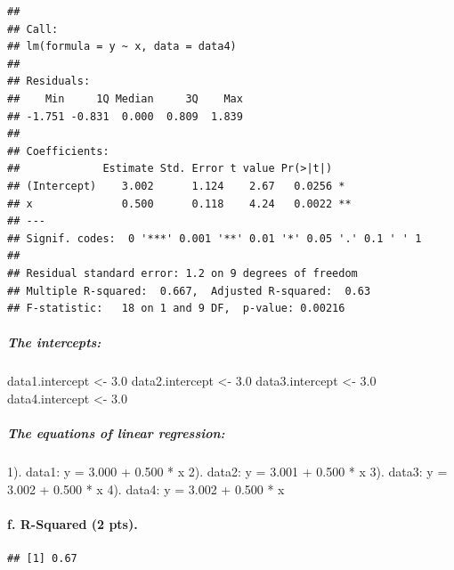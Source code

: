 \documentclass[]{article}
\newenvironment{Shaded}{\begin{snugshade}}{\end{snugshade}}
\newcommand{\KeywordTok}[1]{\textcolor[rgb]{0.13,0.29,0.53}{\textbf{#1}}}
\newcommand{\FloatTok}[1]{\textcolor[rgb]{0.00,0.00,0.81}{#1}}
\newcommand{\StringTok}[1]{\textcolor[rgb]{0.31,0.60,0.02}{#1}}
\newcommand{\OperatorTok}[1]{\textcolor[rgb]{0.81,0.36,0.00}{\textbf{#1}}}
\newcommand{\NormalTok}[1]{#1}
\let\oldparagraph\paragraph
\renewcommand{\paragraph}[1]{\oldparagraph{#1}\mbox{}}
\let\oldsubparagraph\subparagraph
\renewcommand{\subparagraph}[1]{\oldsubparagraph{#1}\mbox{}}
\begin{document}
\begin{verbatim}
## 
## Call:
## lm(formula = y ~ x, data = data4)
## 
## Residuals:
##    Min     1Q Median     3Q    Max 
## -1.751 -0.831  0.000  0.809  1.839 
## 
## Coefficients:
##             Estimate Std. Error t value Pr(>|t|)   
## (Intercept)    3.002      1.124    2.67   0.0256 * 
## x              0.500      0.118    4.24   0.0022 **
## ---
## Signif. codes:  0 '***' 0.001 '**' 0.01 '*' 0.05 '.' 0.1 ' ' 1
## 
## Residual standard error: 1.2 on 9 degrees of freedom
## Multiple R-squared:  0.667,  Adjusted R-squared:  0.63 
## F-statistic:   18 on 1 and 9 DF,  p-value: 0.00216
\end{verbatim}

\subparagraph{The intercepts:}\label{the-intercepts}

\begin{Shaded}
\begin{Highlighting}[]
\NormalTok{data1.intercept <-}\StringTok{ }\FloatTok{3.0}
\NormalTok{data2.intercept <-}\StringTok{ }\FloatTok{3.0}
\NormalTok{data3.intercept <-}\StringTok{ }\FloatTok{3.0}
\NormalTok{data4.intercept <-}\StringTok{ }\FloatTok{3.0}
\end{Highlighting}
\end{Shaded}

\subparagraph{The equations of linear
regression:}\label{the-equations-of-linear-regression}

1). data1: y = 3.000 + 0.500 * x 2). data2: y = 3.001 + 0.500 * x 3).
data3: y = 3.002 + 0.500 * x 4). data4: y = 3.002 + 0.500 * x

\paragraph{f. R-Squared (2 pts).}\label{f.-r-squared-2-pts.}

\begin{Shaded}
\end{Shaded}

\begin{verbatim}
## [1] 0.67
\end{verbatim}

\begin{Shaded}
\end{Shaded}
\end{document}

